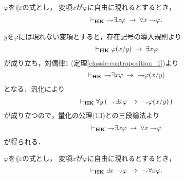 	\begin{screen}
		\begin{thm}
		\label{classic:weak_De_Morgan_law_for_quantifier_1}
			$\varphi$を$\lang{\varepsilon}$の式とし，
			変項$x$が$\varphi$に自由に現れるとするとき，
			\begin{align}
				\vdash_{{\scriptsize \mbox{{\bf HK}}}}
				\ \rightharpoondown\hspace{-0.25em} \exists x \varphi \hspace{0.25em}\rightarrow\hspace{0.25em} \forall x \rightharpoondown\hspace{-0.25em} \varphi.
			\end{align}
		\end{thm}
	\end{screen}
	
	\begin{sketch}
		$y$を$\varphi$には現れない変項とすると，存在記号の導入規則より
		\begin{align}
			\vdash_{{\scriptsize \mbox{{\bf HK}}}} \varphi(x/y) \hspace{0.25em}\rightarrow\hspace{0.25em} \exists x \varphi
		\end{align}
		が成り立ち，対偶律$1$ (定理\ref{classic:contraposition_1})より
		\begin{align}
			\provable{\mbox{{\bf HK}}}\ 
			\negation \exists x \varphi \rarrow\ \negation \varphi(x/y) 
		\end{align}
		となる．汎化により
		\begin{align}
			\vdash_{{\scriptsize \mbox{{\bf HK}}}} \forall y\, (\, \rightharpoondown\hspace{-0.25em} \exists x \varphi \hspace{0.25em}\rightarrow\hspace{0.25em}\ \rightharpoondown\hspace{-0.25em} \varphi(x/y) \, ) 
		\end{align}
		が成り立つので，量化の公理(UI)との三段論法より
		\begin{align}
			\provable{\mbox{{\bf HK}}}\ 
			\negation \exists x \varphi \rarrow \forall x \negation \varphi 
		\end{align}
		が得られる．
		\QED
	\end{sketch}
	
	\begin{screen}
		\begin{thm}
		\label{classic:strong_De_Morgan_law_for_quantifier_1}
			$\varphi$を$\lang{\varepsilon}$の式とし，
			変項$x$が$\varphi$に自由に現れるとするとき，
			\begin{align}
				\vdash_{{\scriptsize \mbox{{\bf HK}}}}
				\exists x \rightharpoondown\hspace{-0.25em} \varphi \hspace{0.25em}\rightarrow\hspace{0.25em}\ \rightharpoondown\hspace{-0.25em} \forall x \varphi.
			\end{align}
		\end{thm}
	\end{screen}
	

